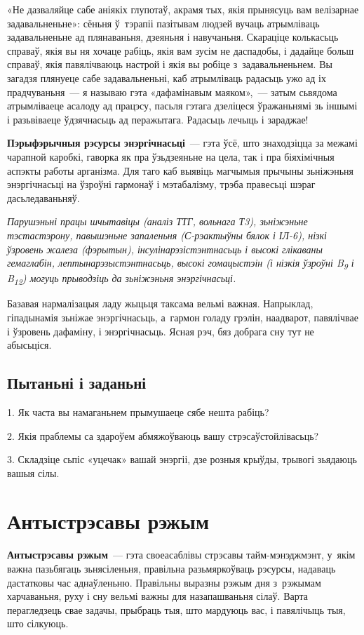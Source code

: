 «Не дазваляйце сабе аніякіх глупотаў, акрамя тых, якія прынясуць вам велізарнае задавальненьне»: сёньня ў~тэрапіі пазітывам людзей вучаць атрымліваць задавальненьне ад плянаваньня, дзеяньня і навучаньня. Скараціце колькасьць справаў, якія вы ня хочаце рабіць, якія вам зусім не даспадобы, і дадайце больш справаў, якія павялічваюць настрой і якія вы робіце з~задавальненьнем. Вы загадзя плянуеце сабе задавальненьні, каб атрымліваць радасьць ужо ад іх прадчуваньня~--- я называю гэта «дафамінавым маяком»,~--- затым сьвядома атрымліваеце асалоду ад працэсу, пасьля гэтага дзеліцеся ўражаньнямі зь іншымі і разьвіваеце ўдзячнасьць ад перажытага. Радасьць лечыць і зараджае!

\textbf{Пэрыфэрычныя рэсурсы энэргічнасьці}~--- гэта ўсё, што знаходзіцца за межамі чарапной каробкі, гаворка як пра ўзьдзеяньне на цела, так і пра біяхімічныя аспэкты работы арганізма. Для таго каб выявіць магчымыя прычыны зьніжэньня энэргічнасьці на ўзроўні гармонаў і мэтабалізму, трэба правесьці шэраг дасьледаваньняў.

\emph{Парушэньні працы шчытавіцы (аналіз ТТГ, вольнага Т3), зьніжэньне тэстастэрону, павышэньне запаленьня (С-рэактыўны бялок і ІЛ-6), нізкі ўзровень жалеза (фэрытын), інсулінарэзістэнтнасьць і высокі глікаваны гемаглабін, лептынарэзыстэнтнасьць, высокі гомацыстэін (і нізкія ўзроўні B\textsubscript{9} і B\textsubscript{12}) могуць прыводзіць да зьніжэньня энэргічнасьці.}

Базавая нармалізацыя ладу жыцьця таксама вельмі важная. Напрыклад, гіпадынамія зьніжае энэргічнасьць, а~гармон голаду грэлін, наадварот, павялічвае і ўзровень дафаміну, і энэргічнасьць. Ясная рэч, бяз добрага сну тут не абысьціся.

\subsection*{Пытаньні і заданьні}

1. Як часта вы намаганьнем прымушаеце сябе нешта рабіць?

2. Якія праблемы са здароўем абмяжоўваюць вашу стрэсаўстойлівасьць?

3. Складзіце сьпіс «уцечак» вашай энэргіі, дзе розныя крыўды, трывогі зьядаюць вашыя сілы.


\section{Антыстрэсавы рэжым}

\textbf{Антыстрэсавы рэжым}~--- гэта своеасаблівы стрэсавы тайм-мэнэджмэнт, у~якім важна пазьбягаць зьнясіленьня, правільна разьмяркоўваць рэсурсы, надаваць дастатковы час аднаўленьню. Правільны выразны рэжым дня з~рэжымам харчаваньня, руху і сну вельмі важны для назапашваньня сілаў. Варта перагледзець свае задачы, прыбраць тыя, што мардуюць вас, і павялічыць тыя, што сілкуюць.

